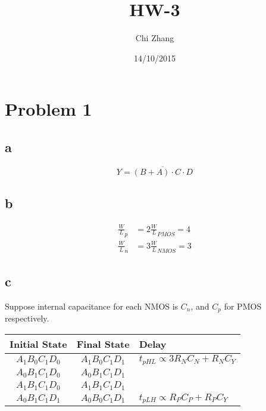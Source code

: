 \documentclass[a4paper,10pt]{article}
\title{HW-3}
\author{Chi Zhang}
\date{14/10/2015}
\begin{document}
\maketitle
\section*{Problem 1}
\subsection*{a}
\begin{equation}
 Y=\overline{(B+A)\cdot C\cdot D}
\end{equation}
\subsection*{b}
\begin{equation}
\begin{split}
\frac{W}{L}_p &= 2\frac{W}{L}_{PMOS} = 4\\
\frac{W}{L}_n &= 3\frac{W}{L}_{NMOS} = 3
\end{split}
\end{equation}
\subsection*{c}
Suppose internal capacitance for each NMOS is \begin{math}C_n\end{math}, and \begin{math}C_p\end{math} for PMOS respectively.\\
\begin{tabular}{|c|c|l|}
 \hline
 Initial State&Final State&Delay\\ \hline
 \begin{math}A_1 B_0 C_1 D_0\end{math} & \begin{math}A_1 B_0 C_1 D_1\end{math} & \begin{math}t_{pHL}\propto 3R_N C_N + R_N C_Y\end{math}\\ \cline{1-2}
 \begin{math}A_0 B_1 C_1 D_0\end{math} & \begin{math}A_0 B_1 C_1 D_1\end{math} &\\ \cline{1-2}
 \begin{math}A_1 B_1 C_1 D_0\end{math} & \begin{math}A_1 B_1 C_1 D_1\end{math} &\\ \hline
 \begin{math}A_0 B_1 C_1 D_1\end{math} & \begin{math}A_0 B_0 C_1 D_1\end{math} & \begin{math}t_{pLH}\propto R_P C_P + R_P C_Y\end{math}\\ \hline
\end{tabular}
\end{document}
